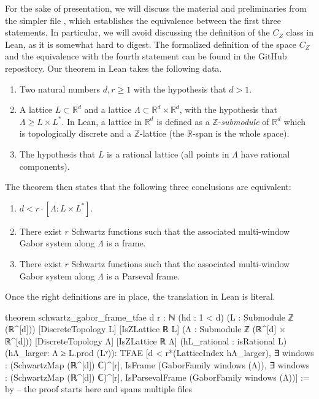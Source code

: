 \documentclass[reqno,a4paper,12pt]{amsart}
\numberwithin{equation}{section}
\newcommand\1{\mathds{1}}
\begin{document}
For the sake of presentation, we will discuss the material and preliminaries from the simpler file , which establishes the equivalence between the first three statements. In particular, we will avoid discussing the definition of the $C_Z$ class in Lean, as it is somewhat hard to digest. The formalized definition of the space $C_Z$ and the equivalence with the fourth statement can be found in the GitHub repository. Our theorem in Lean takes the following data.
\begin{enumerate}
    \item Two natural numbers $d,r\geq 1$ with the hypothesis that $d>1$.
    \item A lattice $L \subset \mathbb R^d$ and a lattice $\Lambda \subset \mathbb R^d\times \mathbb R^d $, with the hypothesis that $\Lambda \geq L\times L^*$.  In Lean, a lattice in $\mathbb R^d$ is defined as a $\mathbb Z$-\textit{submodule} of $\mathbb R^d$ which is topologically discrete and a $\mathbb Z$-lattice (the $\mathbb{R}$-span is the whole space).
    \item The hypothesis that $L$ is a rational lattice (all points in $\Lambda$ have rational components). 
\end{enumerate}
The theorem then states that the following three conclusions are equivalent:
\begin{enumerate}
    \item $d<r \cdot  [\Lambda : L\times L^*]$.
    \item There exist $r$ Schwartz functions such that the associated multi-window Gabor system along $\Lambda$ is a frame.
    \item There exist $r$ Schwartz functions such that the associated multi-window Gabor system along $\Lambda$ is a Parseval frame.
\end{enumerate}

Once the right definitions are in place, the translation in Lean is literal.

\begin{leancode}
theorem schwartz_gabor_frame_tfae {d r : ℕ} (hd : 1 < d)
    (L : Submodule ℤ (ℝ^[d])) [DiscreteTopology L] [IsZLattice ℝ L]
    (Λ : Submodule ℤ (ℝ^[d] × ℝ^[d])) [DiscreteTopology Λ] [IsZLattice ℝ Λ]
    (hL_rational : isRational L) (hΛ_larger: Λ ≥ L.prod (Lᵛ)):
    TFAE
      [d < r*(LatticeIndex hΛ_larger),
       ∃ windows : (SchwartzMap (ℝ^[d]) ℂ)^[r], 
        IsFrame (GaborFamily windows (Λ)),
       ∃ windows : (SchwartzMap (ℝ^[d]) ℂ)^[r],
          IsParsevalFrame 
          (GaborFamily windows (Λ))]
    := by  -- the proof starts here and spans multiple files
\end{leancode}
\end{document}
